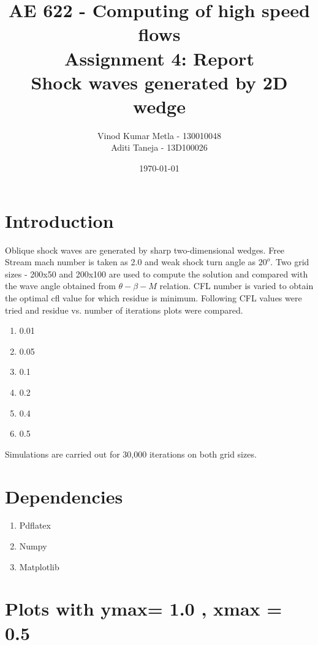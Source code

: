 \documentclass{article}
\title{AE 622 -  Computing of high speed flows\\ Assignment 4: Report \\ Shock waves generated by 2D wedge}
\author{Vinod Kumar Metla - 130010048\\Aditi Taneja - 13D100026}
\date{\today}
\begin{document}
\maketitle
\newpage
\section*{Introduction}
Oblique shock waves are generated by sharp two-dimensional wedges. Free Stream mach number is taken as 2.0 and weak shock turn angle as $20^o$. Two grid sizes - 200x50 and 200x100 are used to compute the solution and compared with the wave angle obtained from $\theta-\beta-M $ relation.
CFL number is varied to obtain the optimal cfl value for which residue is minimum.
Following CFL values were tried and residue vs. number of iterations plots were compared.
\begin{enumerate}
\item 0.01
\item 0.05
\item 0.1
\item 0.2
\item 0.4
\item 0.5

\end{enumerate}

Simulations are carried out for 30,000 iterations on both grid sizes.

\section*{Dependencies}
\begin{enumerate}
\item Pdflatex 
\item Numpy
\item Matplotlib

\end{enumerate}
\newpage

\section*{Plots with ymax= 1.0 , xmax = 0.5}
\end{document}

